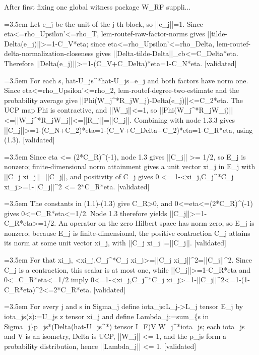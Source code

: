 \documentclass{article}
\newcommand{\step}[1]{\par\noindent\hangindent=3.5em\hangafter=1%
  \makebox[3.5em][l]{\textbf{#1.}}}
\newcommand{\steptag}[1]{\hfill{\small\textsf{[#1]}}}
\begin{document}
\begin{proofbox}{After first fixing one global witness package W\_RF suppli...}
\step{1.3.3} Let e\_j be the unit of the j-th block, so ||e\_j||=1. Since eta<=rho\_Upsilon'<=rho\_T, lem-routef-raw-factor-norms gives ||tilde-Delta(e\_j)||>=1-C\_V*eta; since eta<=rho\_Upsilon'<=rho\_Delta, lem-routef-delta-normalization-closeness gives ||Delta-tilde-Delta||\_cb<=C\_Delta*eta. Therefore ||Delta(e\_j)||>=1-(C\_V+C\_Delta)*eta=1-C\_N*eta. \steptag{validated} \\[4pt]
\step{1.3.4} For each s, hat-U\_js\textasciicircum{}*hat-U\_js=e\_j and both factors have norm one. Since eta<=rho\_Upsilon'<=rho\_2, lem-routef-degree-two-estimate and the probability average give ||Phi(W\_j\textasciicircum{}*R\_jW\_j)-Delta(e\_j)||<=C\_2*eta. The UCP map Phi is contractive, and ||W\_j||<=1, so ||Phi(W\_j\textasciicircum{}*R\_jW\_j)||<=||W\_j\textasciicircum{}*R\_jW\_j||<=||R\_j||=||C\_j||. Combining with node 1.3.3 gives ||C\_j||>=1-(C\_N+C\_2)*eta=1-(C\_V+C\_Delta+C\_2)*eta=1-C\_R*eta, using (1.3). \steptag{validated} \\[4pt]
\step{1.4} Since eta <= (2*C\_R)\textasciicircum{}(-1), node 1.3 gives ||C\_j|| >= 1/2, so E\_j is nonzero; finite-dimensional norm attainment gives a unit vector xi\_j in E\_j with ||C\_j xi\_j||=||C\_j||, and positivity of C\_j gives 0 <= 1-<xi\_j,C\_j\textasciicircum{}*C\_j xi\_j>=1-||C\_j||\textasciicircum{}2 <= 2*C\_R*eta. \steptag{validated} \\[6pt]
\step{1.4.1} The constants in (1.1)-(1.3) give C\_R>0, and 0<=eta<=(2*C\_R)\textasciicircum{}(-1) gives 0<=C\_R*eta<=1/2. Node 1.3 therefore yields ||C\_j||>=1-C\_R*eta>=1/2. An operator on the zero Hilbert space has norm zero, so E\_j is nonzero; because E\_j is finite-dimensional, the positive contraction C\_j attains its norm at some unit vector xi\_j, with ||C\_j xi\_j||=||C\_j||. \steptag{validated} \\[4pt]
\step{1.4.2} For that xi\_j, <xi\_j,C\_j\textasciicircum{}*C\_j xi\_j>=||C\_j xi\_j||\textasciicircum{}2=||C\_j||\textasciicircum{}2. Since C\_j is a contraction, this scalar is at most one, while ||C\_j||>=1-C\_R*eta and 0<=C\_R*eta<=1/2 imply 0<=1-<xi\_j,C\_j\textasciicircum{}*C\_j xi\_j>=1-||C\_j||\textasciicircum{}2<=1-(1-C\_R*eta)\textasciicircum{}2<=2*C\_R*eta. \steptag{validated} \\[4pt]
\step{1.5} For every j and s in Sigma\_j define iota\_js:L\_j->L\_j tensor E\_j by iota\_js(z):=U\_js z tensor xi\_j and define Lambda\_j:=sum\_\{s in Sigma\_j\}p\_js*(Delta(hat-U\_js\textasciicircum{}*) tensor I\_F)V W\_j\textasciicircum{}*iota\_js; each iota\_js and V is an isometry, Delta is UCP, ||W\_j|| <= 1, and the p\_js form a probability distribution, hence ||Lambda\_j|| <= 1. \steptag{validated} \\[6pt]

\end{proofbox}
\end{document}
